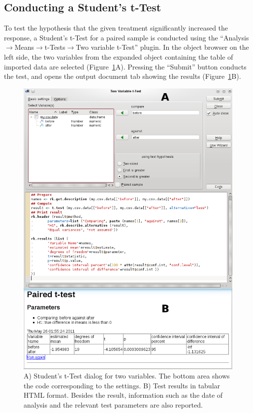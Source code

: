 \subsection{Conducting a Student's t-Test}
\label{sec:conducting_ttest}
To test the hypothesis that the given treatment significantly increased the response, a Student's
t-Test for a paired sample is conducted using the
``Analysis$\rightarrow$Means$\rightarrow$t-Tests$\rightarrow$Two variable t-Test'' plugin.
In the object browser on the left side, the two variables from the expanded
 object containing the table of imported data 
are selected (Figure~\ref{fig:t_test}A). 
Pressing the ``Submit'' button conducts the test, and opens the output document tab
showing the results (Figure~\ref{fig:t_test}B).


\begin{figure}[b!]
 \centering
 \includegraphics[width=14cm]{./figures/t-test2.png}
 \caption{A) Student's t-Test dialog for two variables. The bottom area shows the  code corresponding to the settings.
  B) Test results in tabular HTML format. 
Besides the result, information such as the date of analysis and the relevant test parameters are also reported.}
 \label{fig:t_test}
\end{figure}

